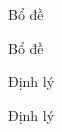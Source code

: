 \documentclass{beamer}
\numberwithin{equation}{section}
\begin{document}
\begin{frame}{Bổ đề}

\begin{block}{Bổ đề}

\end{block}



\end{frame}
\begin{frame}{Định lý}

    \begin{block}{Định lý}
    
    \end{block}
    
    
    
    \end{frame}
\end{document}
